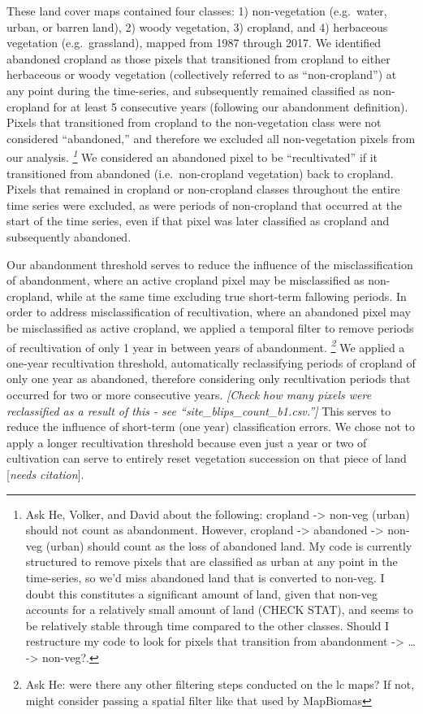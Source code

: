 \documentclass[
]{article}
\begin{document}
These land cover maps contained four classes: 1) non-vegetation (e.g.~water, urban, or barren land), 2) woody vegetation, 3) cropland, and 4) herbaceous vegetation (e.g.~grassland), mapped from 1987 through 2017.
We identified abandoned cropland as those pixels that transitioned from cropland to either herbaceous or woody vegetation (collectively referred to as ``non-cropland'') at any point during the time-series, and subsequently remained classified as non-cropland for at least 5 consecutive years (following our abandonment definition).
Pixels that transitioned from cropland to the non-vegetation class were not considered ``abandoned,'' and therefore we excluded all non-vegetation pixels from our analysis. \emph{\footnote{Ask He, Volker, and David about the following: cropland -\textgreater{} non-veg (urban) should not count as abandonment. However, cropland -\textgreater{} abandoned -\textgreater{} non-veg (urban) should count as the loss of abandoned land. My code is currently structured to remove pixels that are classified as urban at any point in the time-series, so we'd miss abandoned land that is converted to non-veg. I doubt this constitutes a significant amount of land, given that non-veg accounts for a relatively small amount of land (CHECK STAT), and seems to be relatively stable through time compared to the other classes. Should I restructure my code to look for pixels that transition from abandonment -\textgreater{} \ldots{} -\textgreater{} non-veg?.}}
We considered an abandoned pixel to be ``recultivated'' if it transitioned from abandoned (i.e.~non-cropland vegetation) back to cropland.
Pixels that remained in cropland or non-cropland classes throughout the entire time series were excluded, as were periods of non-cropland that occurred at the start of the time series, even if that pixel was later classified as cropland and subsequently abandoned.

Our abandonment threshold serves to reduce the influence of the misclassification of abandonment, where an active cropland pixel may be misclassified as non-cropland, while at the same time excluding true short-term fallowing periods.
In order to address misclassification of recultivation, where an abandoned pixel may be misclassified as active cropland, we applied a temporal filter to remove periods of recultivation of only 1 year in between years of abandonment. \emph{\footnote{Ask He: were there any other filtering steps conducted on the lc maps? If not, might consider passing a spatial filter like that used by MapBiomas}}
We applied a one-year recultivation threshold, automatically reclassifying periods of cropland of only one year as abandoned, therefore considering only recultivation periods that occurred for two or more consecutive years. \emph{{[}Check how many pixels were reclassified as a result of this - see ``site\_blips\_count\_b1.csv.''{]}}
This serves to reduce the influence of short-term (one year) classification errors.
We chose not to apply a longer recultivation threshold because even just a year or two of cultivation can serve to entirely reset vegetation succession on that piece of land {[}\emph{needs citation}{]}.
\end{document}
